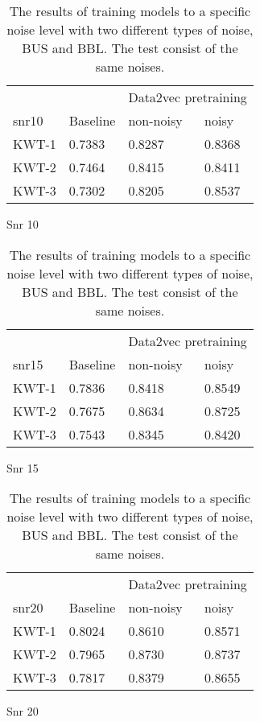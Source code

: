 \begin{table}[ht]
    \begin{subtable}[ht]{0.45\textwidth}
        \centering
        \begin{tabular}{@{}llll@{}}
        \toprule
        & & \multicolumn{2}{c}{Data2vec pretraining} \\ \cline{3-4}
        snr10    & Baseline & non-noisy & noisy \\ \midrule
        KWT-1    & 0.7383  & 0.8287 & 0.8368 \\
        KWT-2    & 0.7464  & 0.8415 & 0.8411 \\
        KWT-3    & 0.7302  & 0.8205 & 0.8537 \\
        \bottomrule
        \end{tabular}
        \caption{Snr 10}
    \end{subtable}
    \hfill
    \begin{subtable}[ht]{0.45\textwidth}
        \centering
        \begin{tabular}{@{}llll@{}}
        \toprule
        & & \multicolumn{2}{c}{Data2vec pretraining} \\ \cline{3-4}
        snr15    & Baseline & non-noisy & noisy \\ \midrule
        KWT-1    & 0.7836  & 0.8418 & 0.8549 \\
        KWT-2    & 0.7675  & 0.8634 & 0.8725 \\
        KWT-3    & 0.7543  & 0.8345 & 0.8420 \\
        \bottomrule
        \end{tabular}
        \caption{Snr 15}
    \end{subtable}

    
    \bigskip


    \begin{subtable}[ht]{0.45\textwidth}
        \centering
        \begin{tabular}{@{}llll@{}}
        \toprule
        & & \multicolumn{2}{c}{Data2vec pretraining} \\ \cline{3-4}
        snr20    & Baseline & non-noisy & noisy \\ \midrule
        KWT-1    & 0.8024  & 0.8610 & 0.8571 \\
        KWT-2    & 0.7965  & 0.8730 & 0.8737 \\
        KWT-3    & 0.7817  & 0.8379 & 0.8655 \\
        \bottomrule
        \end{tabular}
        \caption{Snr 20}
    \end{subtable}
    \caption{The results of training models to a specific noise level with two different types of noise, BUS and BBL. The test consist of the same noises.}
    \label{tab:test_noise}
\end{table}


